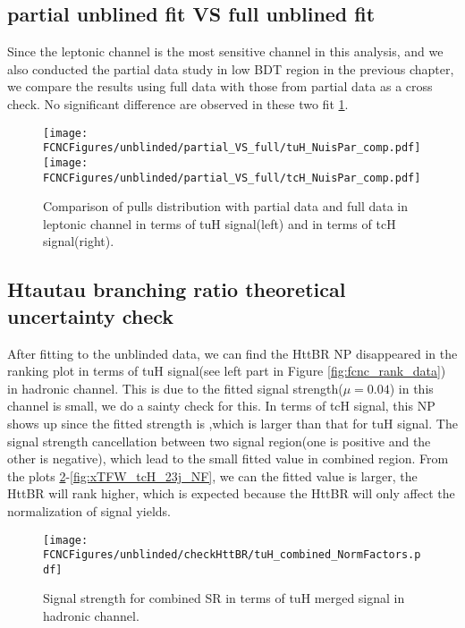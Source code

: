 \subsection{partial unblined fit VS full unblined fit}
Since the leptonic channel is the most sensitive channel in this analysis, and we also conducted the partial data study in low BDT region in the previous chapter, we compare the results using full data with those from partial data as a cross check.
No significant difference are observed in these two fit \ref{fig:tthML_partialVSfull}.

\begin{figure}[H]
\centering
\texttt{[image: \\FCNCFigures/unblinded/partial\_VS\_full/tuH\_NuisPar\_comp.pdf]}
\texttt{[image: \\FCNCFigures/unblinded/partial\_VS\_full/tcH\_NuisPar\_comp.pdf]}
\\
\caption{Comparison of pulls distribution with partial data and full data in leptonic channel in terms of tuH signal(left) and in terms of tcH signal(right).}
\label{fig:tthML_partialVSfull}
\end{figure}

\subsection{Htautau branching ratio theoretical uncertainty check}
After fitting to the unblinded data, we can find the HttBR NP disappeared in the ranking plot in terms of tuH signal(see left part in Figure \ref{fig:fcnc_rank_data}) in hadronic channel. This is due to the fitted signal strength($\mu=0.04$) in this channel is small, we do a sainty check for this. In terms of tcH signal, this NP shows up since the fitted strength is ,which is larger than that for tuH signal. The signal strength cancellation between two signal region(one is positive and the other is negative), which lead to the small fitted value in combined region. From the plots \ref{fig:xTFW_tuH_NF}-\ref{fig:xTFW_tcH_23j_NF}, we can the fitted value is larger, the HttBR will rank higher, which is expected because the HttBR will only affect the normalization of signal yields.


\begin{figure}[H]
\centering
\texttt{[image: \\FCNCFigures/unblinded/checkHttBR/tuH\_combined\_NormFactors.pdf]}
\\
\caption{Signal strength for combined SR in terms of tuH merged signal in hadronic channel.}
\label{fig:xTFW_tuH_NF}
\end{figure}



